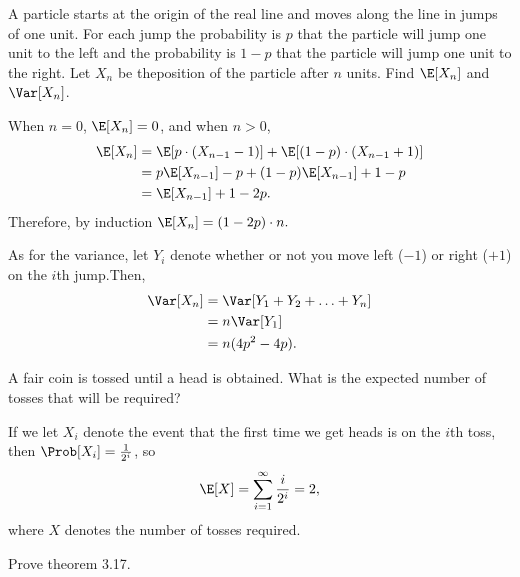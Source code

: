 \documentclass[a4paper]{article}
\begin{document}
\begin{Exercise}
	A particle starts at the origin of the real line and moves along the line in jumps of one unit. For each jump the probability is $p$ that the particle will jump one unit to the left and the probability is $1 - p$ that the particle will jump one unit to the right. Let $X_n$ be theposition of the particle after $n$ units. Find $\E[X_n]$ and $\Var[X_n]$.
\end{Exercise}
\begin{Solution}
	When $n = 0$, $\E[X_n] = 0$, and when $n > 0$,
	\begin{align*}
		\E[X_n] &= \E[p \cdot (X_{n - 1} - 1)] + \E[(1 - p) \cdot (X_{n - 1} + 1)]
		     \\ &= p \E[X_{n - 1}] - p + (1 - p) \E[X_{n - 1}] + 1 - p
		     \\ &= \E[X_{n - 1}] + 1 - 2p.
	\end{align*}
	Therefore, by induction $\E[X_n] = (1 - 2p) \cdot n.$ 

	As for the variance, let $Y_i$ denote whether or not you move left ($-1$) or right ($+1$) on the $i$th jump.Then,
	\begin{align*}
		\Var[X_n] &= \Var[Y_1 + Y_2 + \ldots + Y_n]
		       \\ &= n \Var[Y_1]
		       \\ &= n (4p^2 - 4p).
	\end{align*}
\end{Solution}
\begin{Exercise}
	A fair coin is tossed until a head is obtained. What is the expected number of tosses that will be required?
\end{Exercise}
\begin{Solution}
	If we let $X_i$ denote the event that the first time we get heads is on the $i$th toss, then $\Prob[X_i] = \frac{1}{2^i}$, so
	\begin{align*}
		\E[X] = \sum_{i = 1}^{\infty} \frac{i}{2^i} = 2,
	\end{align*}
	where $X$ denotes the number of tosses required.
\end{Solution}
\begin{Exercise}
\end{Exercise}
\begin{Exercise}
\end{Exercise}
\begin{Exercise}
	Prove theorem 3.17.
\end{Exercise}
\end{document}
